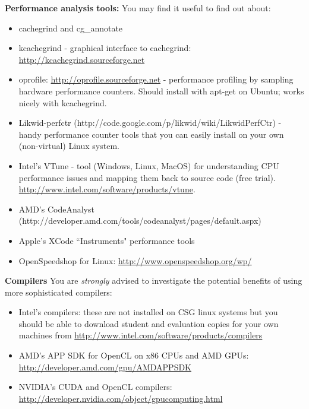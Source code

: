 \documentclass{article}
\begin{document}
\textbf{Performance analysis tools:} You may find it useful to find out about:
\begin{itemize}
\item cachegrind and cg\_annotate
\item kcachegrind - graphical interface to cachegrind: \url{http://kcachegrind.sourceforge.net}
\item oprofile: \url{http://oprofile.sourceforge.net} - performance profiling by sampling hardware performance counters.  Should install with apt-get on Ubuntu; works nicely with kcachegrind.
\item Likwid-perfctr (http://code.google.com/p/likwid/wiki/LikwidPerfCtr) - handy performance counter tools that you can easily install on your own (non-virtual) Linux system.
\item Intel's VTune - tool (Windows, Linux, MacOS) for understanding CPU performance issues and mapping them back to source code (free trial). \url{http://www.intel.com/software/products/vtune}.
\item AMD's CodeAnalyst (http://developer.amd.com/tools/codeanalyst/pages/default.aspx)
\item Apple's XCode ``Instruments" performance tools
\item OpenSpeedshop for Linux: \url{http://www.openspeedshop.org/wp/}
\end{itemize}

\textbf{Compilers}
You are {\em strongly} advised to investigate the potential benefits of using more sophisticated compilers:

\begin{itemize}
\item Intel's compilers: these are not installed on CSG linux systems
but you should be able to download student and evaluation copies for your own machines from \url{http://www.intel.com/software/products/compilers}
\item AMD's APP SDK for OpenCL on x86 CPUs and AMD GPUs: \url{http://developer.amd.com/gpu/AMDAPPSDK}
\item NVIDIA's CUDA and OpenCL compilers: \url{http://developer.nvidia.com/object/gpucomputing.html}
\end{itemize}
\end{document}
